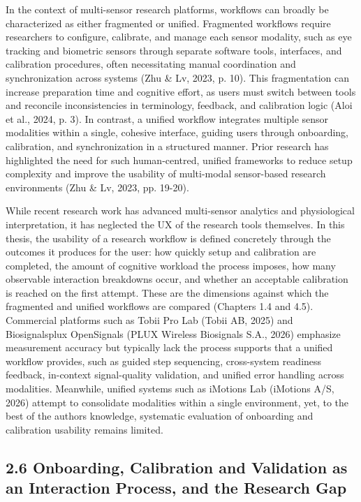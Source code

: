 \documentclass[
]{article}
\begin{document}
In the context of multi-sensor research platforms, workflows can broadly be characterized as either fragmented or unified. Fragmented workflows require researchers to configure, calibrate, and manage each sensor modality, such as eye tracking and biometric sensors through separate software tools, interfaces, and calibration procedures, often necessitating manual coordination and synchronization across systems (Zhu \& Lv, 2023, p. 10). This fragmentation can increase preparation time and cognitive effort, as users must switch between tools and reconcile inconsistencies in terminology, feedback, and calibration logic (Aloi et al., 2024, p. 3). In contrast, a unified workflow integrates multiple sensor modalities within a single, cohesive interface, guiding users through onboarding, calibration, and synchronization in a structured manner. Prior research has highlighted the need for such human-centred, unified frameworks to reduce setup complexity and improve the usability of multi-modal sensor-based research environments (Zhu \& Lv, 2023, pp. 19-20).

While recent research work has advanced multi-sensor analytics and physiological interpretation, it has neglected the UX of the research tools themselves. In this thesis, the usability of a research workflow is defined concretely through the outcomes it produces for the user: how quickly setup and calibration are completed, the amount of cognitive workload the process imposes, how many observable interaction breakdowns occur, and whether an acceptable calibration is reached on the first attempt. These are the dimensions against which the fragmented and unified workflows are compared (Chapters 1.4 and 4.5). Commercial platforms such as Tobii Pro Lab (Tobii AB, 2025) and Biosignalsplux OpenSignals (PLUX Wireless Biosignals S.A., 2026) emphasize measurement accuracy but typically lack the process supports that a unified workflow provides, such as guided step sequencing, cross-system readiness feedback, in-context signal-quality validation, and unified error handling across modalities. Meanwhile, unified systems such as iMotions Lab (iMotions A/S, 2026) attempt to consolidate modalities within a single environment, yet, to the best of the author\textquotesingle s knowledge, systematic evaluation of onboarding and calibration usability remains limited.

\hypertarget{onboarding-calibration-and-validation-as-an-interaction-process-and-the-research-gap}{%
\subsection{\texorpdfstring{2.6 Onboarding, Calibration and Validation as an Interaction Process, and the Research Gap }{2.6 Onboarding, Calibration and Validation as an Interaction Process, and the Research Gap }}\label{onboarding-calibration-and-validation-as-an-interaction-process-and-the-research-gap}}
\end{document}
